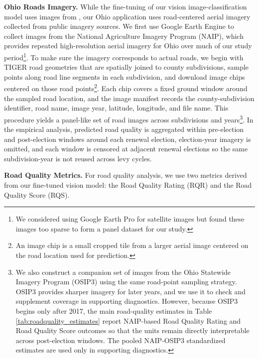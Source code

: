 {\bf Ohio Roads Imagery.} While the fine-tuning of our vision image-classification model uses images from \cite{brewer2021}, our Ohio application uses road-centered aerial imagery collected from public imagery sources. We first use Google Earth Engine to collect images from the National Agriculture Imagery Program (NAIP), which provides repeated high-resolution aerial imagery for Ohio over much of our study period\footnote{We considered using Google Earth Pro for satellite images but found these images too sparse to form a panel dataset for our study.}. To make sure the imagery corresponds to actual roads, we begin with TIGER road geometries that are spatially joined to county subdivisions, sample points along road line segments in each subdivision, and download image chips centered on those road points\footnote{An image chip is a small cropped tile from a larger aerial image centered on the road location used for prediction.}. Each chip covers a fixed ground window around the sampled road location, and the image manifest records the county-subdivision identifier, road name, image year, latitude, longitude, and file name. This procedure yields a panel-like set of road images across subdivisions and years\footnote{We also construct a companion set of images from the Ohio Statewide Imagery Program (OSIP3) using the same road-point sampling strategy. OSIP3 provides sharper imagery for later years, and we use it to check and supplement coverage in supporting diagnostics. However, because OSIP3 begins only after 2017, the main road-quality estimates in Table \ref{tab:roadquality_estimates} report NAIP-based Road Quality Rating and Road Quality Score outcomes so that the units remain directly interpretable across post-election windows. The pooled NAIP-OSIP3 standardized estimates are used only in supporting diagnostics.}. In the empirical analysis, predicted road quality is aggregated within pre-election and post-election windows around each renewal election, election-year imagery is omitted, and each window is censored at adjacent renewal elections so the same subdivision-year is not reused across levy cycles.



















{\bf Road Quality Metrics.}  For road quality analysis, we use two metrics derived from our fine-tuned vision model: the Road Quality Rating (RQR) and the Road Quality Score (RQS).

